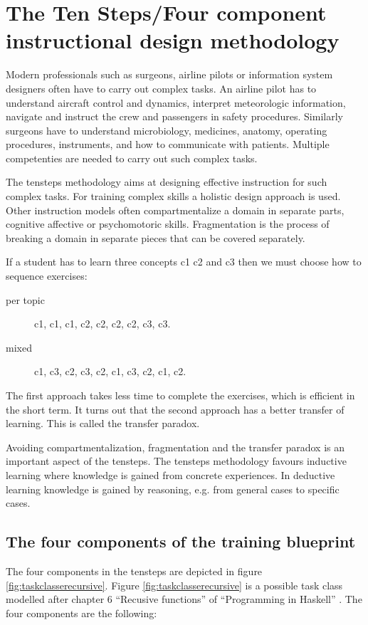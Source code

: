 \section{The Ten Steps/Four component instructional design methodology}
Modern professionals such as surgeons, airline pilots or information system designers often have to carry out complex tasks.
An airline pilot has to understand aircraft control and dynamics, interpret meteorologic information, navigate and instruct the crew and passengers in safety procedures.
Similarly surgeons have to understand microbiology, medicines, anatomy, operating procedures, instruments, and how to communicate with patients.
Multiple competenties are needed to carry out such complex tasks.

The \gls{tensteps} methodology aims at designing effective instruction for such complex tasks.
For training complex skills a holistic design approach is used.
Other instruction models often compartmentalize a domain in separate parts, cognitive affective or psychomotoric skills.
Fragmentation is the process of breaking a domain in separate pieces that can be covered separately.

If a student has to learn three concepts c1 c2 and c3 then we must choose how to sequence exercises:
\begin{description}
\item[per topic] c1, c1, c1, c2, c2, c2, c2, c3, c3.
\item [mixed] c1, c3, c2, c3, c2, c1, c3, c2, c1, c2.
\end{description}

The first approach takes less time to complete the exercises, which is efficient in the short term.
It turns out that the second approach has a better transfer of learning. This is called the transfer paradox.

Avoiding compartmentalization, fragmentation and the transfer paradox is an important aspect of the \gls{tensteps}.
The \gls{tensteps} methodology favours inductive learning where knowledge is gained from concrete experiences.
In deductive learning knowledge is gained by reasoning, e.g. from general cases to specific cases.


\subsection{The four components of the training blueprint}
\label{tsblueprint}


The four components in the \gls{tensteps} are depicted in figure \ref{fig:taskclasserecursive}.
Figure  \ref{fig:taskclasserecursive} is a possible task class modelled after chapter 6 ``Recusive functions'' of ``Programming in Haskell'' \citep{hutton_2016}.
The four components are the following:

